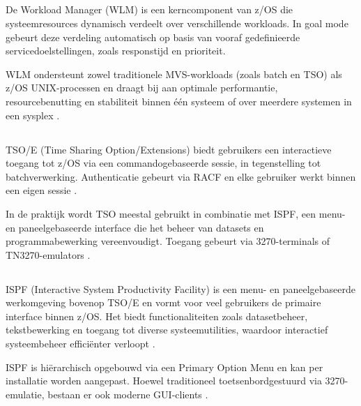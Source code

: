 \subsection{}
\label{sec:workload-management}

De Workload Manager (WLM) is een kerncomponent van z/OS die systeemresources dynamisch verdeelt over verschillende workloads. In goal mode gebeurt deze verdeling automatisch op basis van vooraf gedefinieerde servicedoelstellingen, zoals responstijd en prioriteit. \autocite{ibm_zos_wlm}

WLM ondersteunt zowel traditionele MVS-workloads (zoals batch en TSO) als z/OS UNIX-processen en draagt bij aan optimale performantie, resourcebenutting en stabiliteit binnen één systeem of over meerdere systemen in een sysplex \autocite{ibm_zos_wlm}.

\subsection{}
\label{sec:tso-op-zos}

TSO/E (Time Sharing Option/Extensions) biedt gebruikers een interactieve toegang tot z/OS via een commandogebaseerde sessie, in tegenstelling tot batchverwerking. Authenticatie gebeurt via RACF en elke gebruiker werkt binnen een eigen sessie \autocite{IBM_zOS_Concepts}.

In de praktijk wordt TSO meestal gebruikt in combinatie met ISPF, een menu- en paneelgebaseerde interface die het beheer van datasets en programmabewerking vereenvoudigt. Toegang gebeurt via 3270-terminals of TN3270-emulators \autocite{IBM_zOS_Concepts}.

\subsection{}
\label{sec:ispf}

ISPF (Interactive System Productivity Facility) is een menu- en paneelgebaseerde werkomgeving bovenop TSO/E en vormt voor veel gebruikers de primaire interface binnen z/OS. Het biedt functionaliteiten zoals datasetbeheer, tekstbewerking en toegang tot diverse systeemutilities, waardoor interactief systeembeheer efficiënter verloopt \autocite{IBM_zOS_Concepts}.

ISPF is hiërarchisch opgebouwd via een Primary Option Menu en kan per installatie worden aangepast. Hoewel traditioneel toetsenbordgestuurd via 3270-emulatie, bestaan er ook moderne GUI-clients \autocite{IBM_zOS_Concepts}.

